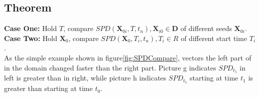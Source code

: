 \documentclass[
     11pt,         %
     a4paper,      %
     oneside,
     ]{article}
\newcommand{\vect}[1]{\boldsymbol{#1}}
\begin{document}
	\subsection{Theorem}
	\textbf{Case One:} Hold $T$, compare $SPD(\vect{X}_{0i},T,t_{n}), \vect{X}_{i0}\in\vect{D}$ of different seeds $\vect{X}_{0i}$.\\
	\textbf{Case Two:} Hold $\vect{X}_{0}$, compare $SPD(\vect{X}_{0},T_{i},t_{n}), T_{i}\in R$ of different start time $T_{i}$.\\
	As the simple example shown in figure\ref{fig:SPDCompare}, vectors the left part of in the domain changed faster than the right part. Picture g indicates $SPD_{t_{5}}$ in left is greater than in right, while picture h indicates $SPD_{t_{5}}$ starting at time $t_{1}$ is greater than starting at time $t_{0}$.\\
	
\end{document}
